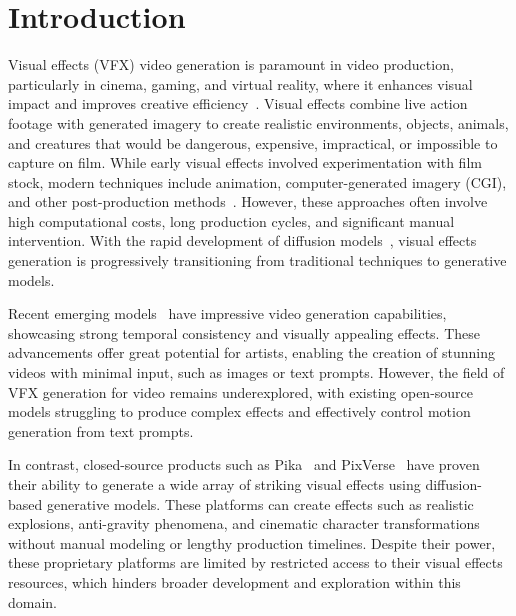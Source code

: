 \section{Introduction}


Visual effects (VFX) video generation is paramount in video production, particularly in cinema, gaming, and virtual reality, where it enhances visual impact and improves creative efficiency~\cite{adobe-guide}. Visual effects combine live action footage with generated imagery to create realistic environments, objects, animals, and creatures that would be dangerous, expensive, impractical, or impossible to capture on film. While early visual effects involved experimentation with film stock, modern techniques include animation, computer-generated imagery (CGI), and other post-production methods~\cite{chabanova2022vfx}. However, these approaches often involve high computational costs, long production cycles, and significant manual intervention. With the rapid development of diffusion models~\cite{blattmann2023stable,ho2020denoising}, visual effects generation is progressively transitioning from traditional techniques to generative models. 

Recent emerging models~\cite{lin2024open,polyak2024movie} have impressive video generation capabilities, showcasing strong temporal consistency and visually appealing effects. These advancements offer great potential for artists, enabling the creation of stunning videos with minimal input, such as images or text prompts. However, the field of VFX generation for video remains underexplored, with existing open-source models struggling to produce complex effects and effectively control motion generation from text prompts.

In contrast, closed-source products such as Pika~\cite{pika2023} and PixVerse~\cite{PixVerse} have proven their ability to generate a wide array of striking visual effects using diffusion-based generative models. These platforms can create effects such as realistic explosions, anti-gravity phenomena, and cinematic character transformations without manual modeling or lengthy production timelines. Despite their power, these proprietary platforms are limited by restricted access to their visual effects resources, which hinders broader development and exploration within this domain.


